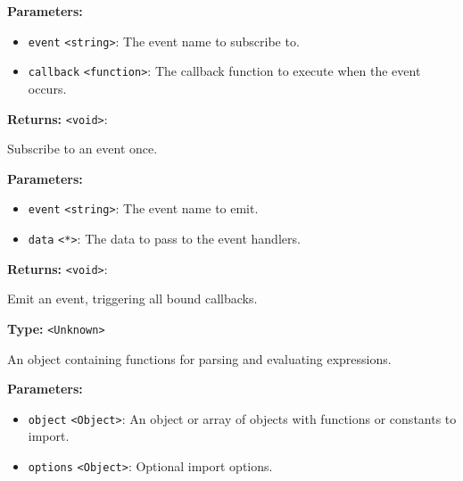 \documentclass[12pt,a4paper]{article}
\begin{document}
\vspace{5mm}
\noindent {}


\noindent \textbf{Parameters:}
\begin{itemize}
  \item \texttt{event} \texttt{<string>}: The event name to subscribe to.
  \item \texttt{callback} \texttt{<function>}: The callback function to execute when the event occurs.
\end{itemize}

\noindent \textbf{Returns:} \texttt{<void>}: 

\noindent Subscribe to an event once.

\vspace{5mm}
\noindent {}


\noindent \textbf{Parameters:}
\begin{itemize}
  \item \texttt{event} \texttt{<string>}: The event name to emit.
  \item \texttt{data} \texttt{<*>}: The data to pass to the event handlers.
\end{itemize}

\noindent \textbf{Returns:} \texttt{<void>}: 

\noindent Emit an event, triggering all bound callbacks.

\vspace{5mm}
\noindent {}\vspace{4mm}


\noindent \textbf{Type:} \texttt{<Unknown>}

\noindent An object containing functions for parsing and evaluating expressions.

\vspace{5mm}
\noindent {}


\noindent \textbf{Parameters:}
\begin{itemize}
  \item \texttt{object} \texttt{<Object>}: An object or array of objects with functions or constants to import.
  \item \texttt{options} \texttt{<Object>}: Optional import options.
\end{itemize}
\end{document}
